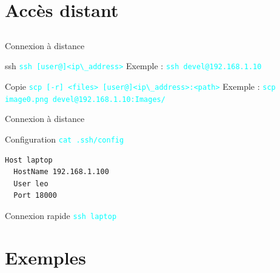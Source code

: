 \documentclass{beamer}
\begin{document}
\section{Accès distant}

\subsection{}

\begin{frame}[fragile]{Connexion à distance}
\begin{block}{ssh}
\textcolor{cyan}{\verb?ssh [user@]<ip\_address>?} \linebreak
Exemple : \linebreak
\textcolor{cyan}{\verb?ssh devel@192.168.1.10?}
\end{block}

\begin{block}{Copie}
\textcolor{cyan}{\verb?scp [-r] <files> [user@]<ip\_address>:<path>?} \linebreak
Exemple : \linebreak
\textcolor{cyan}{\verb?scp image0.png devel@192.168.1.10:Images/?}
\end{block}
\end{frame}

\begin{frame}[fragile]{Connexion à distance}
\begin{block}{Configuration}
\textcolor{cyan}{\verb?cat .ssh/config?}
\begin{verbatim}
Host laptop
  HostName 192.168.1.100
  User leo
  Port 18000
\end{verbatim}
\end{block}

\begin{block}{Connexion rapide}
\textcolor{cyan}{\verb?ssh laptop?} 
\end{block}
\end{frame}


\section{Exemples}

\subsection{}
\end{document}
